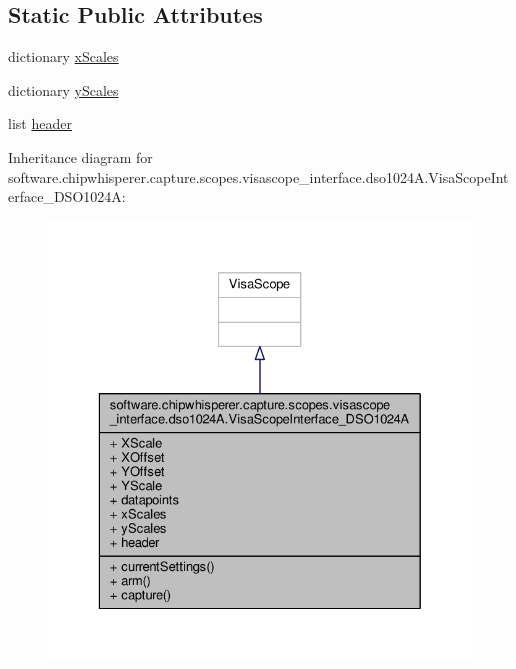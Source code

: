 \subsection*{Static Public Attributes}
\begin{DoxyCompactItemize}
\item 
dictionary \hyperlink{classsoftware_1_1chipwhisperer_1_1capture_1_1scopes_1_1visascope__interface_1_1dso1024A_1_1VisaScopeInterface__DSO1024A_a46f83ab9ebef915acf5dac907925e59b}{x\+Scales}
\item 
dictionary \hyperlink{classsoftware_1_1chipwhisperer_1_1capture_1_1scopes_1_1visascope__interface_1_1dso1024A_1_1VisaScopeInterface__DSO1024A_ae1b1484709c78000ec9c4c5bff986724}{y\+Scales}
\item 
list \hyperlink{classsoftware_1_1chipwhisperer_1_1capture_1_1scopes_1_1visascope__interface_1_1dso1024A_1_1VisaScopeInterface__DSO1024A_ab3e59dadec242c852ed7894ba3f27b29}{header}
\end{DoxyCompactItemize}


Inheritance diagram for software.\+chipwhisperer.\+capture.\+scopes.\+visascope\+\_\+interface.\+dso1024\+A.\+Visa\+Scope\+Interface\+\_\+\+D\+S\+O1024\+A\+:\nopagebreak
\begin{figure}[H]
\begin{center}
\leavevmode
\includegraphics[width=329pt]{db/df5/classsoftware_1_1chipwhisperer_1_1capture_1_1scopes_1_1visascope__interface_1_1dso1024A_1_1VisaS4b40c4feca773619407cf9873b989ca7}
\end{center}
\end{figure}


